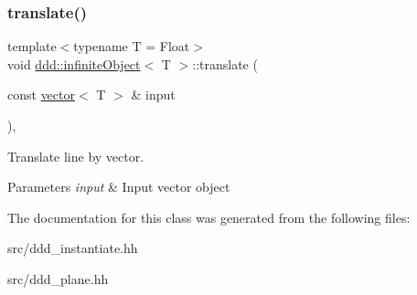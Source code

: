 \subsubsection{\texorpdfstring{translate()}{translate()}}
{\footnotesize\ttfamily template$<$typename T = Float$>$ \\
void \hyperlink{classddd_1_1infinite_object}{ddd\+::infinite\+Object}$<$ T $>$\+::translate (\begin{DoxyParamCaption}\item[{const \hyperlink{classddd_1_1vector}{vector}$<$ T $>$ \&}]{input }\end{DoxyParamCaption})\hspace{0.3cm}{\ttfamily [inline]}, {\ttfamily [inherited]}}



Translate line by vector. 


\begin{DoxyParams}{Parameters}
{\em input} & Input vector object \\
\hline
\end{DoxyParams}


The documentation for this class was generated from the following files\+:\begin{DoxyCompactItemize}
\item 
src/ddd\+\_\+instantiate.\+hh\item 
src/ddd\+\_\+plane.\+hh\end{DoxyCompactItemize}
